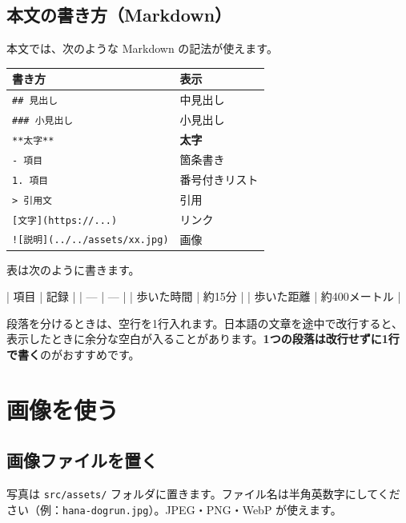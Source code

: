 \documentclass[a4paper,11pt]{ltjsarticle}
\newcommand{\file}[1]{\texttt{#1}}
\begin{document}
\subsection{本文の書き方（Markdown）}

本文では、次のような Markdown の記法が使えます。

\begin{center}
\begin{tabular}{@{}ll@{}}
\toprule
書き方 & 表示 \\
\midrule
\verb|## 見出し| & 中見出し \\
\verb|### 小見出し| & 小見出し \\
\verb|**太字**| & \textbf{太字} \\
\verb|- 項目| & 箇条書き \\
\verb|1. 項目| & 番号付きリスト \\
\verb|> 引用文| & 引用 \\
\verb|[文字](https://...)| & リンク \\
\verb|![説明](../../assets/xx.jpg)| & 画像 \\
\bottomrule
\end{tabular}
\end{center}

表は次のように書きます。

\begin{code}
| 項目 | 記録 |
| --- | --- |
| 歩いた時間 | 約15分 |
| 歩いた距離 | 約400メートル |
\end{code}

\begin{hint}[段落と改行]
段落を分けるときは、空行を1行入れます。日本語の文章を途中で改行すると、表示したときに余分な空白が入ることがあります。\textbf{1つの段落は改行せずに1行で書く}のがおすすめです。
\end{hint}

\section{画像を使う}\label{sec:image}

\subsection{画像ファイルを置く}

写真は \file{src/assets/} フォルダに置きます。ファイル名は半角英数字にしてください（例：\file{hana-dogrun.jpg}）。JPEG・PNG・WebP が使えます。
\end{document}
